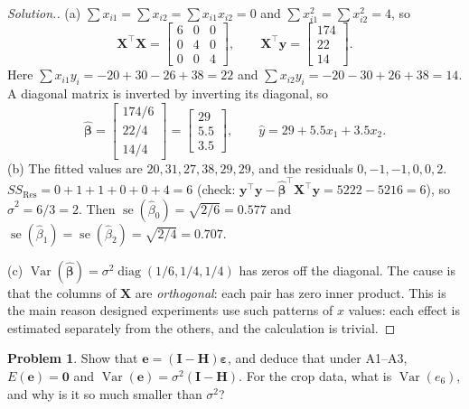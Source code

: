 \documentclass[11pt,a4paper]{article}
\numberwithin{equation}{section}
\theoremstyle{definition}
\newtheorem{problemx}{Problem}[subsection]
\newenvironment{problem}{\begin{problemx}}{\end{problemx}}
\newenvironment{solution}
  {\renewcommand{\qedsymbol}{}\begin{proof}[\textit{Solution}.]}
  {\end{proof}}
\begin{document}
\begin{solution}
(a) $\sum x_{i1} = \sum x_{i2} = \sum x_{i1}x_{i2} = 0$ and $\sum x_{i1}^2 = \sum x_{i2}^2 = 4$, so
\[
\mathbf{X}^\top\mathbf{X} = \begin{bmatrix} 6 & 0 & 0 \\ 0 & 4 & 0 \\ 0 & 0 & 4 \end{bmatrix},
\qquad
\mathbf{X}^\top\mathbf{y} = \begin{bmatrix} 174 \\ 22 \\ 14 \end{bmatrix} .
\]
Here $\sum x_{i1}y_i = -20 + 30 - 26 + 38 = 22$ and $\sum x_{i2}y_i = -20 - 30 + 26 + 38 = 14$.
A diagonal matrix is inverted by inverting its diagonal, so
\[
\hat{\boldsymbol\beta} = \begin{bmatrix} 174/6 \\ 22/4 \\ 14/4 \end{bmatrix} = \begin{bmatrix} 29 \\ 5.5 \\ 3.5 \end{bmatrix},
\qquad \hat y = 29 + 5.5x_1 + 3.5x_2 .
\]
(b) The fitted values are $20, 31, 27, 38, 29, 29$, and the residuals $0, -1, -1, 0, 0, 2$.
$SS_{\mathrm{Res}} = 0 + 1 + 1 + 0 + 0 + 4 = 6$ (check: $\mathbf{y}^\top\mathbf{y} - \hat{\boldsymbol\beta}^\top\mathbf{X}^\top\mathbf{y} = 5222 - 5216 = 6$),
so $\hat\sigma^2 = 6/3 = 2$. Then $\operatorname{se}(\hat\beta_0) = \sqrt{2/6} = 0.577$ and
$\operatorname{se}(\hat\beta_1) = \operatorname{se}(\hat\beta_2) = \sqrt{2/4} = 0.707$.

(c) $\operatorname{Var}(\hat{\boldsymbol\beta}) = \sigma^2\operatorname{diag}(1/6, 1/4, 1/4)$
has zeros off the diagonal. The cause is that the columns of $\mathbf{X}$ are
\emph{orthogonal}: each pair has zero inner product. This is the main reason designed
experiments use such patterns of $x$ values: each effect is estimated separately from the
others, and the calculation is trivial.
\end{solution}

\begin{problem}
Show that $\mathbf{e} = (\mathbf{I} - \mathbf{H})\boldsymbol\varepsilon$, and deduce that
under A1--A3, $E(\mathbf{e}) = \mathbf{0}$ and $\operatorname{Var}(\mathbf{e}) = \sigma^2(\mathbf{I} - \mathbf{H})$.
For the crop data, what is $\operatorname{Var}(e_6)$, and why is it so much smaller than
$\sigma^2$?
\end{problem}
\end{document}
